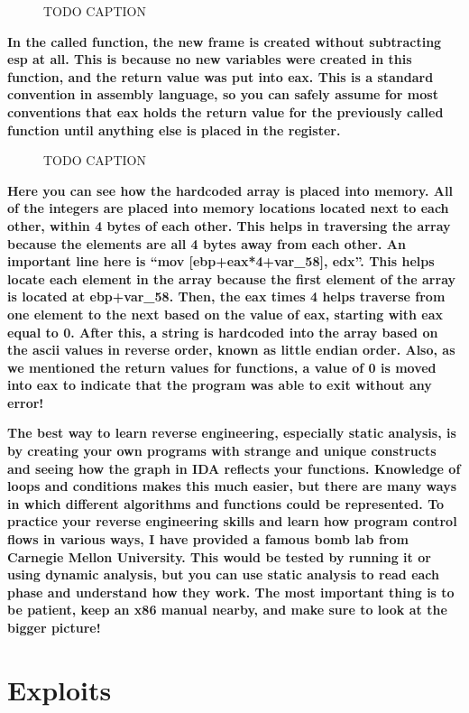 \documentclass[letterpaper]{article}
\newcommand{\sitfig}[3]{
\begin{figure}[H]
\centering
\makebox[\textwidth][c]{
#2
}
\caption{#3}
\label{#1}
\end{figure}
}
\newcommand{\sitgfx}[4][scale=1.0]{
\sitfig{#3}{\texttt{[image: \#2]}}{#4}
}
\begin{document}
  
\sitgfx[width=3.3646in,height=3.7602in]{FINALWORKINGDOCFORMERLYPRECURSOR-img071.png}{fig:unk}{TODO CAPTION}
 

\textbf{In the called function, the new frame is created without subtracting esp at all. This is because no new
variables were created in this function, and the return value was put into eax. This is a standard convention in
assembly language, so you can safely assume for most conventions that eax holds the return value for the previously
called function until anything else is placed in the register.}

  
\sitgfx[width=6.5in,height=4.5311in]{FINALWORKINGDOCFORMERLYPRECURSOR-img072.png}{fig:unk}{TODO CAPTION}
 

\textbf{Here you can see how the hardcoded array is placed into memory. All of the integers are placed into memory
locations located next to each other, within 4 bytes of each other. This helps in traversing the array because the
elements are all 4 bytes away from each other. An important line here is ``mov [ebp+eax*4+var\_58], edx''. This helps
locate each element in the array because the first element of the array is located at ebp+var\_58. Then, the eax times
4 helps traverse from one element to the next based on the value of eax, starting with eax equal to 0. After this, a
string is hardcoded into the array based on the ascii values in reverse order, known as little endian order. Also, as
we mentioned the return values for functions, a value of 0 is moved into eax to indicate that the program was able to
exit without any error!}

\textbf{The best way to learn reverse engineering, especially static analysis, is by creating your own programs with
strange and unique constructs and seeing how the graph in IDA reflects your functions. Knowledge of loops and
conditions makes this much easier, but there are many ways in which different algorithms and functions could be
represented. To practice your reverse engineering skills and learn how program control flows in various ways, I have
provided a famous bomb lab from Carnegie Mellon University. This would be tested by running it or using dynamic
analysis, but you can use static analysis to read each phase and understand how they work. The most important thing is
to be patient, keep an x86 manual nearby, and make sure to look at the bigger picture!}

\section{Exploits}
\end{document}
